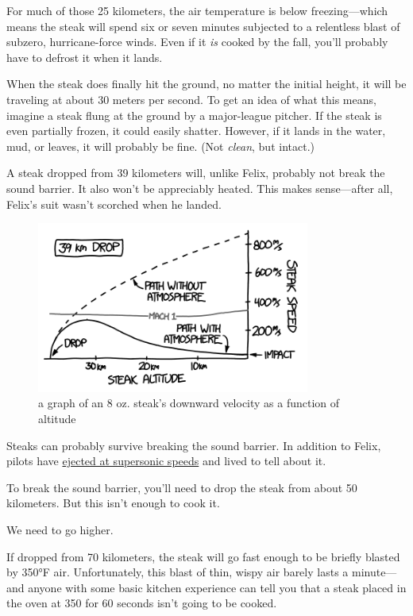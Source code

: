{For much of those 25 kilometers, the air temperature is below freezing—which means the steak will spend six or seven minutes subjected to a relentless blast of subzero, hurricane-force winds. Even if it \emph{is} cooked by the fall, you’ll probably have to defrost it when it lands.}

{When the steak does finally hit the ground, no matter the initial height, it will be traveling at about 30 meters per second. To get an idea of what this means, imagine a steak flung at the ground by a major-league pitcher. If the steak is even partially frozen, it could easily shatter. However, if it lands in the water, mud, or leaves, it will probably be fine. (Not \emph{clean}, but intact.)}

{A steak dropped from 39 kilometers will, unlike Felix, probably not break the sound barrier. It also won’t be appreciably heated. This makes sense—after all, Felix’s suit wasn’t scorched when he landed.}

\begin{figure}[!htbp]
\centering
\includegraphics[scale=0.5, max width=0.8\textwidth]{imgs/a/28/steak_39km.png}
\caption{a graph of an 8 oz. steak's downward velocity as a function of altitude}
\end{figure}

{Steaks can probably survive breaking the sound barrier. In addition to Felix, pilots have \href{http://www.ejectionsite.com/insaddle/insaddle.htm}{ejected at supersonic speeds} and lived to tell about it.}

{To break the sound barrier, you’ll need to drop the steak from about 50 kilometers. But this isn’t enough to cook it.}

{We need to go higher.}

{If dropped from 70 kilometers, the steak will go fast enough to be briefly blasted by 350°F air. Unfortunately, this blast of thin, wispy air barely lasts a minute—and anyone with some basic kitchen experience can tell you that a steak placed in the oven at 350 for 60 seconds isn’t going to be cooked.}

